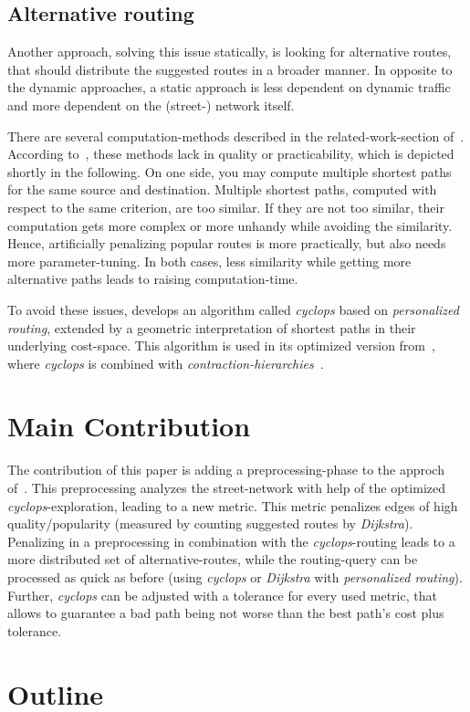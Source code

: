     \subsection{Alternative routing}

    Another approach, solving this issue statically, is looking for alternative routes, that should distribute the suggested routes in a broader manner.
    In opposite to the dynamic approaches, a static approach is less dependent on dynamic traffic and more dependent on the (street-) network itself.

    There are several computation-methods described in the related-work-section of~\cite{barth:alternative_routes}.
    According to~, these methods lack in quality or practicability, which is depicted shortly in the following.
    On one side, you may compute multiple shortest paths for the same source and destination.
    Multiple shortest paths, computed with respect to the same criterion, are too similar.
    If they are not too similar, their computation gets more complex or more unhandy while avoiding the similarity.
    Hence, artificially  penalizing popular routes is more practically, but also needs more parameter-tuning.
    In both cases, less similarity while getting more alternative paths leads to raising computation-time.

    To avoid these issues, \cite{barth:alternative_routes} develops an algorithm called \textit{cyclops} based on \textit{personalized routing}, extended by a geometric interpretation of shortest paths in their underlying cost-space.
    This algorithm is used in its optimized version from~\cite{barth:alternative_multicriteria_routes}, where \textit{cyclops} is combined with \textit{contraction-hierarchies}~\cite{geisberger:contraction_hierarchies}.

    \section{Main Contribution}

    The contribution of this paper is adding a preprocessing-phase to the approch of~\cite{barth:alternative_multicriteria_routes}.
    This preprocessing analyzes the street-network with help of the optimized \textit{cyclops}-exploration, leading to a new metric.
    This metric penalizes edges of high quality/popularity (measured by counting suggested routes by \textit{Dijkstra}).
    Penalizing in a preprocessing in combination with the \textit{cyclops}-routing leads to a more distributed set of alternative-routes, while the routing-query can be processed as quick as before (using \textit{cyclops} or \textit{Dijkstra} with \textit{personalized routing}).
    Further, \textit{cyclops} can be adjusted with a tolerance for every used metric, that allows to guarantee a bad path being not worse than the best path's cost plus tolerance.

    \section{Outline}

